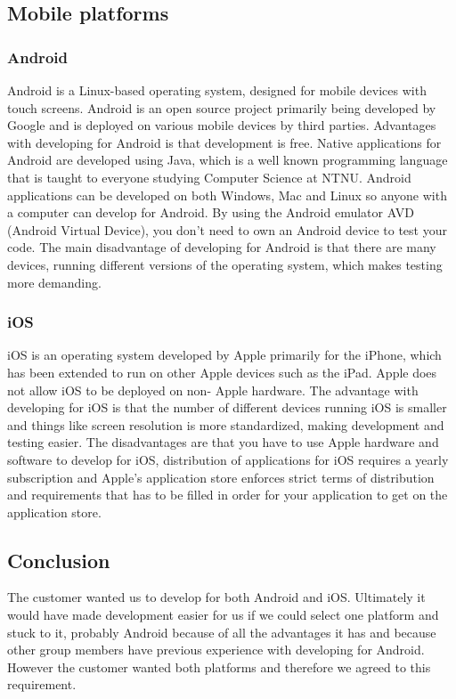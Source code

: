 \subsection{Mobile platforms}

\subsubsection*{Android}

    Android is a Linux-based operating system, designed for mobile devices with touch screens.
    Android is an open source project primarily being developed by Google and is deployed on various
    mobile devices by third parties.\cite{android} Advantages with developing for Android is that
    development is free. Native applications for Android are developed using Java, which is a well
    known programming language that is taught to everyone studying Computer Science at NTNU. Android
    applications can be developed on both Windows, Mac and Linux so anyone with a computer can
    develop for Android. By using the Android emulator AVD (Android Virtual Device), you don't need
    to own an Android device to test your code. The main disadvantage of developing for Android is
    that there are many devices, running different versions of the operating system, which makes
    testing more demanding.

\subsubsection*{iOS}

    iOS is an operating system developed by Apple primarily for the iPhone, which has been extended
    to run on other Apple devices such as the iPad. Apple does not allow iOS to be deployed on non-
    Apple hardware.\cite{ios} The advantage with developing for iOS is that the number of different
    devices running iOS is smaller and things like screen resolution is more standardized, making
    development and testing easier. The disadvantages are that you have to use Apple hardware and
    software to develop for iOS, distribution of applications for iOS requires a yearly
    subscription\cite{iosCost} and Apple's application store enforces strict terms of distribution
    and requirements that has to be filled in order for your application to get on the application
    store.

\subsection{Conclusion}

    The customer wanted us to develop for both Android and iOS.
    Ultimately it would have made development easier for us if we could select one platform and
    stuck to it, probably Android because of all the advantages it has and because other group
    members have previous experience with developing for Android. However the customer wanted both
    platforms and therefore we agreed to this requirement.
